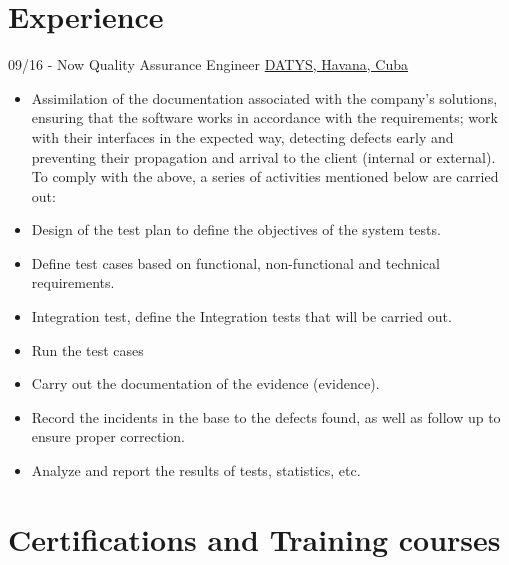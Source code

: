 \documentclass[letterpaper]{twentysecondcv} %
\begin{document}
\makeprofile %
 

\section{Experience}

\begin{twenty} %
\twentyitem
    	{09/16 - Now}
		{}
        {Quality Assurance Engineer}
        {\href{http://datys.cu/}{DATYS, Havana, Cuba}}
        {}
        {
        {\begin{itemize}
        \item Assimilation of the documentation associated with the company's solutions, ensuring that the software works in accordance with the requirements; work with their interfaces in the expected way, detecting defects early and preventing their propagation and arrival to the client (internal or external). To comply with the above, a series of activities mentioned below are carried out:
\item Design of the test plan to define the objectives of the system tests.
\item Define test cases based on functional, non-functional and technical requirements.
\item Integration test, define the Integration tests that will be carried out.
\item Run the test cases
\item Carry out the documentation of the evidence (evidence).
\item Record the incidents in the base to the defects found, as well as follow up to ensure proper correction.
\item Analyze and report the results of tests, statistics, etc.
        \end{itemize}}
        }
        
\end{twenty}

\section{Certifications and Training courses}
\end{document}
